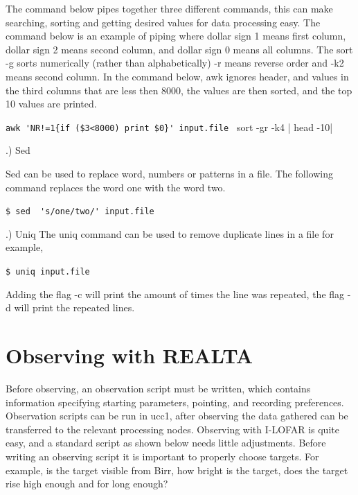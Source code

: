 \documentclass[11pt,fleqn]{book} %
\begin{document}
\noindent The command below pipes together three different commands, this can make searching, sorting and getting desired values for data processing easy. The command below is an example of piping where dollar sign 1 means first column, dollar sign 2 means second column, and  dollar sign 0 means all columns. The sort -g sorts numerically (rather than alphabetically) -r means reverse order and -k2 means second column. In the command below, awk ignores header, and values in the third columns that are less then 8000, the values are then sorted, and the top 10 values are printed.

\vspace{3mm}

\verb|awk 'NR!=1{if ($3<8000) print $0}' input.file | sort -gr -k4 | head -10|

\vspace{3mm}

.) Sed
\vspace{3mm}

\noindent Sed can be used to replace word, numbers or patterns in a file. The following command replaces the word one with the word two.
\vspace{3mm}

\verb|$ sed  's/one/two/' input.file|

\vspace{3mm}

.) Uniq
\noindent The uniq command can be used to remove duplicate lines in a file for example,
\vspace{3mm}

\verb|$ uniq input.file|

\vspace{3mm}
\noindent Adding the flag -c will print the amount of times the line was repeated, the flag -d will print the repeated lines.
%



\section{Observing with REALTA}

%
Before observing, an observation script must be written, which contains information specifying starting parameters, pointing, and recording preferences. Observation scripts can be run in ucc1, after observing the data gathered can be transferred to the relevant processing nodes. Observing with I-LOFAR is quite easy, and a standard script as shown below needs little adjustments. Before writing an observing script it is important to properly choose targets. For example, is the target visible from Birr, how bright is the target, does the target rise high enough and for long enough? 
\end{document}
